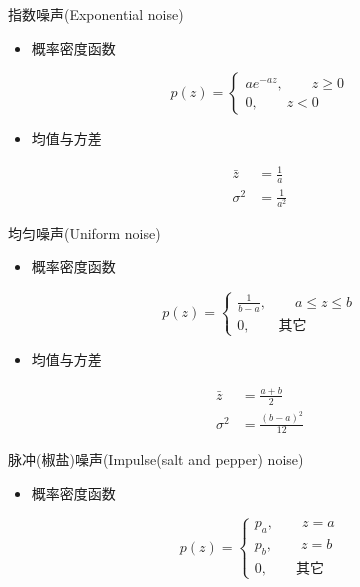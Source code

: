 \documentclass[presentation]{beamer}
\begin{document}
\begin{frame}[label={sec:org0076312}]{指数噪声(Exponential noise)}
\begin{itemize}
\item 概率密度函数
\end{itemize}
\[ p(z) = 
\begin{cases}
a e^{-az}, \qquad z\geq 0 \\
0, \qquad z<0
\end{cases}\]

\begin{itemize}
\item 均值与方差
\end{itemize}
\begin{align*}
    \bar z &= \frac{1}{a} \\
    \sigma^2 &=  \frac{1}{a^2}
\end{align*}
\end{frame}

\begin{frame}[label={sec:orgc35fcc8}]{均匀噪声(Uniform noise)}
\begin{itemize}
\item 概率密度函数
\end{itemize}
\[ p(z) = 
\begin{cases}
\frac{1}{b-a}, \qquad a\leq z \leq b \\
0, \qquad \text{其它}
\end{cases} \]

\begin{itemize}
\item 均值与方差
\end{itemize}
\begin{align*}
    \bar z &= \frac{a+b}{2} \\
    \sigma^2 &=  \frac{(b-a)^2}{12}
\end{align*}
\end{frame}

\begin{frame}[label={sec:org3e29527}]{脉冲(椒盐)噪声(Impulse(salt and pepper) noise)}
\begin{itemize}
\item 概率密度函数
\end{itemize}
\[ p(z) = 
\begin{cases}
p_a, \qquad z=a \\
p_b, \qquad z=b \\
0, \qquad \text{其它}
\end{cases} \]
\end{frame}
\end{document}
